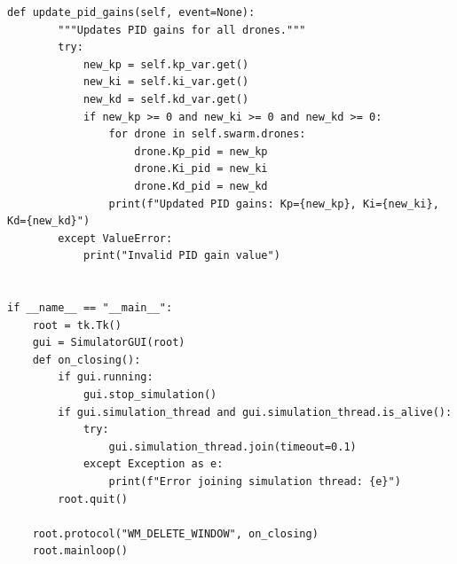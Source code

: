 \documentclass[11pt]{article}
\begin{document}
\begin{lstlisting}[style=pythonstyle]
    def update_pid_gains(self, event=None):
        """Updates PID gains for all drones."""
        try:
            new_kp = self.kp_var.get()
            new_ki = self.ki_var.get()
            new_kd = self.kd_var.get()
            if new_kp >= 0 and new_ki >= 0 and new_kd >= 0:
                for drone in self.swarm.drones:
                    drone.Kp_pid = new_kp
                    drone.Ki_pid = new_ki
                    drone.Kd_pid = new_kd
                print(f"Updated PID gains: Kp={new_kp}, Ki={new_ki}, Kd={new_kd}")
        except ValueError:
            print("Invalid PID gain value")


if __name__ == "__main__":
    root = tk.Tk()
    gui = SimulatorGUI(root)
    def on_closing():
        if gui.running:
            gui.stop_simulation()
        if gui.simulation_thread and gui.simulation_thread.is_alive():
            try:
                gui.simulation_thread.join(timeout=0.1)
            except Exception as e:
                print(f"Error joining simulation thread: {e}")
        root.quit()

    root.protocol("WM_DELETE_WINDOW", on_closing)
    root.mainloop()  
\end{lstlisting}
\end{document}
